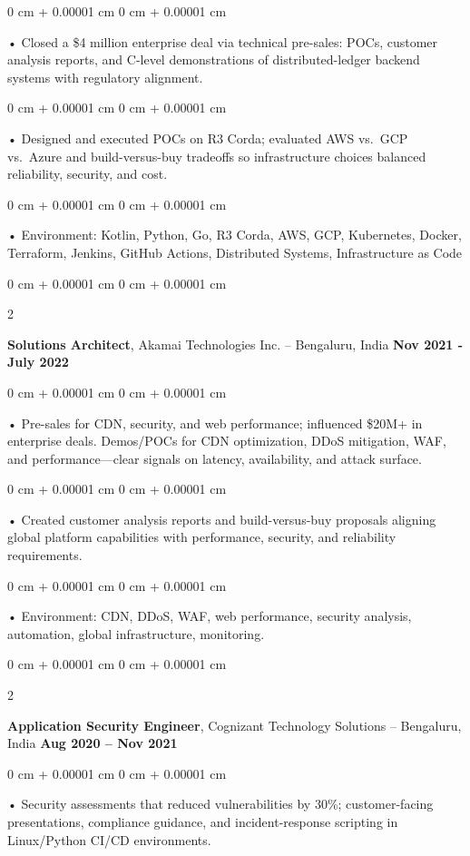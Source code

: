 \documentclass[10pt, letterpaper]{article}
\newenvironment{onecolentry}{
    \begin{adjustwidth}{
        0 cm + 0.00001 cm
    }{
        0 cm + 0.00001 cm
    }
}{
    \end{adjustwidth}
} %
\newenvironment{twocolentry}[2][]{
    \onecolentry
    \def\secondColumn{#2}
    \setcolumnwidth{\fill, 4.5 cm}
    \begin{paracol}{2}
}{
    \switchcolumn \raggedleft \secondColumn
    \end{paracol}
    \endonecolentry
} %
\begin{document}
        \begin{onecolentry}
             • Closed a \$4 million enterprise deal via technical pre-sales: POCs, customer analysis reports, and C-level demonstrations of distributed-ledger backend systems with regulatory alignment.
        \end{onecolentry}
        \begin{onecolentry}
             • Designed and executed POCs on R3 Corda; evaluated AWS vs.\ GCP vs.\ Azure and build-versus-buy tradeoffs so infrastructure choices balanced reliability, security, and cost.
        \end{onecolentry}
        \begin{onecolentry}
             • Environment: Kotlin, Python, Go, R3 Corda, AWS, GCP, Kubernetes, Docker, Terraform, Jenkins, GitHub Actions, Distributed Systems, Infrastructure as Code
        \end{onecolentry}
        \vspace{0.1cm}

        \begin{twocolentry}{
            \textbf{Nov 2021 - July 2022}
        }
            \textbf{Solutions Architect}, Akamai Technologies Inc. -- Bengaluru, India \end{twocolentry}
        \begin{onecolentry}
            • Pre-sales for CDN, security, and web performance; influenced \$20M+ in enterprise deals. Demos/POCs for CDN optimization, DDoS mitigation, WAF, and performance---clear signals on latency, availability, and attack surface.
        \end{onecolentry}
        \begin{onecolentry}
             • Created customer analysis reports and build-versus-buy proposals aligning global platform capabilities with performance, security, and reliability requirements.
        \end{onecolentry}
        \begin{onecolentry}
             • Environment: CDN, DDoS, WAF, web performance, security analysis, automation, global infrastructure, monitoring.
        \end{onecolentry}

        \begin{twocolentry}{
            \textbf{Aug 2020 – Nov 2021}
        }
            \vspace{2 pt }
            \textbf{Application Security Engineer}, Cognizant Technology Solutions -- Bengaluru, India\end{twocolentry}
        \begin{onecolentry}
             • Security assessments that reduced vulnerabilities by 30\%; customer-facing presentations, compliance guidance, and incident-response scripting in Linux/Python CI/CD environments.
        \end{onecolentry}
\end{document}
